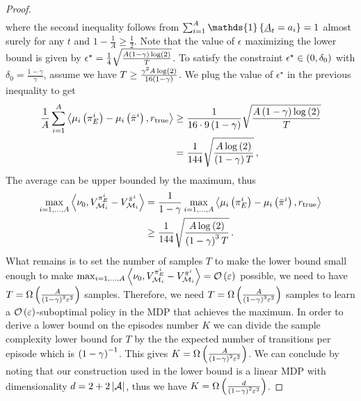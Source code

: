 \begin{proof}
\begin{align*}
    \end{align*}
    where the second inequality follows from $\sum_{i=1}^A \mathds{1} \scbr{\underline{A}_t = a_i} = 1$ almost surely for any $t$ and $1 - \frac1A \geq \frac12$. Note that the value of $\epsilon$ maximizing the lower bound is given by $\epsilon^\star = \frac14 \sqrt{\frac{A \left( 1 - \gamma \right) \log \left( 2 \right)}{T}}$. To satisfy the constraint $\epsilon^\star \in \left( 0, \delta_0 \right)$ with $\delta_0 = \frac{1 - \gamma}{\gamma}$, assume we have $T \geq \frac{\gamma^2 A \log \left( 2 \right)}{16 \left( 1 - \gamma \right)}$. We plug the value of $\epsilon^\star$ in the previous inequality to get
    \begin{align*}
        \frac1A \sum_{i = 1}^A \left\langle \mu_i \left( \pi_E^i \right) - \mu_i \left( \bar\pi^i \right), r_{\textup{true}} \right\rangle &\geq \frac{1}{16 \cdot 9 \left( 1 - \gamma \right)} \sqrt{\frac{A \left( 1 - \gamma \right) \log \left( 2 \right)}{T}} \\
        &= \frac{1}{144} \sqrt{\frac{A \log \left( 2 \right)}{\left( 1 - \gamma \right) T}}\,,
    \end{align*}
    The average can be upper bounded by the maximum, thus
    \begin{align*}
        \max_{i = 1, \dots, A} \left\langle \nu_0, V_{\mathcal{M}_i}^{\pi_E^i} - V_{\mathcal{M}_i}^{\bar\pi^i} \right\rangle &= \frac{1}{1 - \gamma} \max_{i = 1, \dots, A} \left\langle \mu_i \left( \pi_E^i \right) - \mu_i \left( \bar\pi^i \right), r_{\textup{true}} \right\rangle \\
        &\geq \frac{1}{144} \sqrt{\frac{A \log \left( 2 \right)}{\left( 1 - \gamma \right)^3 T}}\,.
    \end{align*}
    What remains is to set the number of samples $T$ to make the lower bound small enough to make $\max_{i = 1, \dots, A} \left\langle \nu_0, V_{\mathcal{M}_i}^{\pi_E^i} - V_{\mathcal{M}_i}^{\bar\pi^i} \right\rangle = \mathcal{O} \left( \varepsilon \right)$ possible, \ie we need to have $T = \Omega \left( \frac{A}{\left( 1 - \gamma \right)^3 \varepsilon^2} \right)$ samples. Therefore, we need $T = \Omega \left( \frac{A}{\left( 1 - \gamma \right)^3 \varepsilon^2} \right)$ samples to learn a $\mathcal{O} \left( \varepsilon \right)$-suboptimal policy in the MDP that achieves the maximum. In order to derive a lower bound on the episodes number $K$ we can divide the sample complexity lower bound for $T$ by the the expected number of transitions per episode which is $\left( 1-\gamma \right)^{-1}$. This gives $K = \Omega \left( \frac{A}{\left( 1 - \gamma \right)^2 \varepsilon^2} \right)$. We can conclude by noting that our construction used in the lower bound is a linear MDP with dimensionality $d = 2 + 2 \left|\mathcal{A}\right|$, thus we have $K = \Omega \left( \frac{d}{\left( 1 - \gamma \right)^2 \varepsilon^2} \right)$.
\end{proof}


